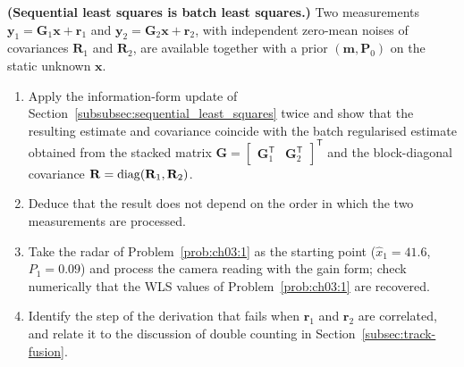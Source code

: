 \begin{prob}\label{prob:ch03:3}
\textbf{(Sequential least squares is batch least squares.)} Two measurements $\mathbf{y}_1=\mathbf{G}_1\mathbf{x}+\mathbf{r}_1$ and $\mathbf{y}_2=\mathbf{G}_2\mathbf{x}+\mathbf{r}_2$, with independent zero-mean noises of covariances $\mathbf{R}_1$ and $\mathbf{R}_2$, are available together with a prior $(\mathbf{m},\mathbf{P}_0)$ on the static unknown $\mathbf{x}$.
\begin{enumerate}
\item[(a)] Apply the information-form update of Section~\ref{subsubsec:sequential_least_squares} twice and show that the resulting estimate and covariance coincide with the batch regularised estimate obtained from the stacked matrix $\mathbf{G}=\begin{bmatrix}\mathbf{G}_1^{\mathsf T}&\mathbf{G}_2^{\mathsf T}\end{bmatrix}^{\mathsf T}$ and the block-diagonal covariance $\mathbf{R}=\operatorname{diag}(\mathbf{R}_1,\mathbf{R}_2)$.
\item[(b)] Deduce that the result does not depend on the order in which the two measurements are processed.
\item[(c)] Take the radar of Problem~\ref{prob:ch03:1} as the starting point ($\widehat{x}_1=41.6$, $P_1=0.09$) and process the camera reading with the gain form; check numerically that the WLS values of Problem~\ref{prob:ch03:1} are recovered.
\item[(d)] Identify the step of the derivation that fails when $\mathbf{r}_1$ and $\mathbf{r}_2$ are correlated, and relate it to the discussion of double counting in Section~\ref{subsec:track-fusion}.
\end{enumerate}
\end{prob}


